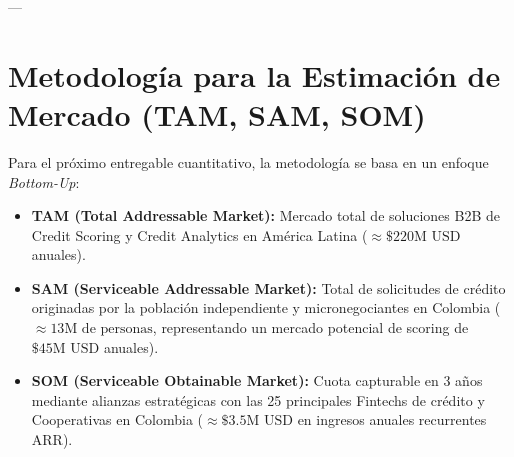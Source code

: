 \documentclass[11pt,a4paper]{article}
\begin{document}
---

\section{Metodología para la Estimación de Mercado (TAM, SAM, SOM)}

Para el próximo entregable cuantitativo, la metodología se basa en un enfoque \textit{Bottom-Up}:
\begin{itemize}[leftmargin=*]
    \item \textbf{TAM (Total Addressable Market):} Mercado total de soluciones B2B de Credit Scoring y Credit Analytics en América Latina ($\approx \$220\text{M USD}$ anuales).
    \item \textbf{SAM (Serviceable Addressable Market):} Total de solicitudes de crédito originadas por la población independiente y micronegociantes en Colombia ($\approx 13\text{M de personas}$, representando un mercado potencial de scoring de $\$45\text{M USD}$ anuales).
    \item \textbf{SOM (Serviceable Obtainable Market):} Cuota capturable en 3 años mediante alianzas estratégicas con las 25 principales Fintechs de crédito y Cooperativas en Colombia ($\approx \$3.5\text{M USD}$ en ingresos anuales recurrentes ARR).
\end{itemize}
\end{document}

